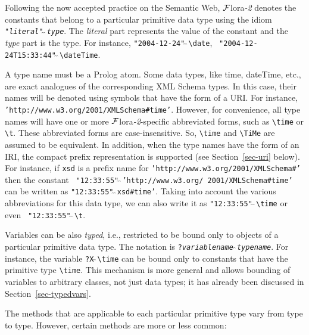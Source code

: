 \documentclass[11pt]{article}
\newcommand{\FLORA}{{\mbox{\sc ${\cal F}${lora}\rm\emph{-2}}}\xspace}
\newcommand{\FLSYSTEM}{\FLORA}
\newcommand{\bs}{\textbackslash}
\begin{document}
Following the now accepted practice on the Semantic Web, \FLSYSTEM denotes the
constants that belong to a particular primitive data type using the idiom
{\tt "\emph{literal}"$\widehat{~}\widehat{~}$\emph{type}}. The \emph{literal} part
represents the value of the constant and the \emph{type} part is the
type. For instance, {\tt "2004-12-24"$\widehat{~}\widehat{~}$\bs{}date}, {\tt
  "2004-12-24T15:33:44"$\widehat{~}\widehat{~}$\bs{}dateTime}.

A type name must be a Prolog atom.
Some data types, like time, dateTime, etc., are exact analogues of the
corresponding XML Schema types. In this case, their names will be denoted
using symbols that have the form of a URI. For instance,
{\tt 'http://www.w3.org/2001/XMLSchema\#time'}.  However, for convenience,
all type names will have one or more \FLSYSTEM-specific abbreviated forms, such as
{\tt \bs{}time} or {\tt \bs{}t}. These abbreviated forms are
case-insensitive. So, {\tt \bs{}time} and
{\tt \bs{}TiMe} are assumed to be equivalent. In addition, when the type names have
the form of an IRI, the compact prefix representation is supported (see
Section~\ref{sec-uri} below). For
instance, if {\tt xsd}  is a prefix name for
{\tt 'http://www.w3.org/2001/XMLSchema\#'} 
then the constant {\tt
  "12:33:55"$\widehat{~}\widehat{~}$'http://www.w3.org/ 2001/XMLSchema\#time'}  can be written as
{\tt "12:33:55"$\widehat{~}\widehat{~}$xsd\#time'}. Taking into account the
various abbreviations for this data type, we can also write it as
{\tt "12:33:55"$\widehat{~}\widehat{~}$\bs{}time} or even {\tt
  "12:33:55"$\widehat{~}\widehat{~}$\bs{}t}.

Variables can be also \emph{typed}, i.e., restricted to be bound only to 
objects of a particular primitive data type.
The notation is {\tt ?\emph{variablename}$\hat{~}\hat{~}$\emph{typename}}. 
For instance, the variable {\tt ?X$\hat{~}\hat{~}$\bs{}time}  
can be bound only to constants that have the primitive type {\tt \bs{}time}. 
This mechanism is more general and allows bounding of variables to
arbitrary classes, not just data types; it has already been discussed in
Section~\ref{sec-typedvars}.

The methods that are applicable to each particular primitive type vary from
type to type. However, certain methods are more or less common:
\end{document}
